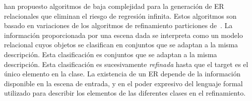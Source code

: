 

\cite{arec2:2008:Areces,arec:usin11} han propuesto algoritmos de baja complejidad
 para la generaci\'on de ER relacionales que eliminan el riesgo de regresi\'on infinita. Estos algoritmos son
basado en variaciones de los algoritmos de refinamiento particiones
de~\cite{paig:thre87}. La informaci\'on proporcionada por una escena dada
se interpreta como un modelo relacional cuyos objetos se clasifican en
conjuntos que se adaptan a la misma descripci\'on. Esta clasificaci\'on es
conjuntos que se adaptan a la misma descripci\'on. Esta clasificaci\'on es
sucesivamente \emph{refinada} hasta que el target es el \'unico elemento
en la clase. La existencia de un ER depende
de la informaci\'on disponible en la escena de entrada, y en el poder expresivo
del lenguaje formal utilizado para describir los elementos de las
diferentes clases en el refinamiento.\\


